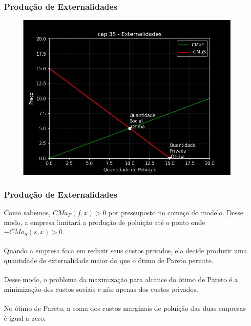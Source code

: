 \documentclass{beamer}[10]
\begin{document}
\begin{frame}
	\frametitle{Produção de Externalidades}

	\begin{figure}[H]
		\centering
		\includegraphics[scale=0.6]{cap35_3-producao_externalidade.png}
	\end{figure}

\end{frame}

\begin{frame}
	\frametitle{Produção de Externalidades}

	Como sabemos, $CMa_F(f,x) > 0$ por pressuposto no começo do modelo. Desse modo, a empresa limitará a produção de poluição até o ponto onde $- CMa_S(s,x) > 0$.
	\\~\\
	Quando a empresa foca em reduzir seus custos privados, ela decide produzir uma quantidade de externalidade maior do que o ótimo de Pareto permite. 
	\\~\\
	Desse modo, o problema da maximização para alcance do ótimo de Pareto é a minimização dos custos sociais e não apenas dos custos privados.
	\\~\\
	No ótimo de Pareto, a soma dos custos marginais de poluição das duas empresas é igual a zero.

\end{frame}
\end{document}
